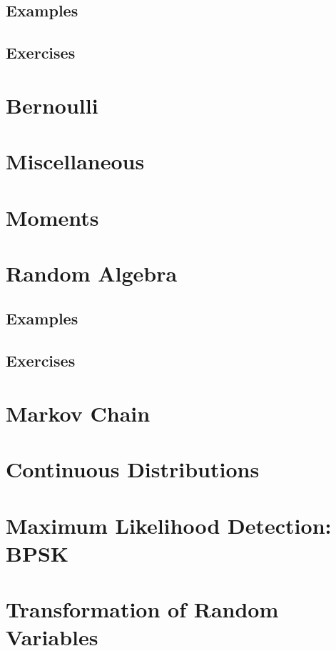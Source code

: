 \documentclass[journal]{IEEEtran}
\begin{document}
\subsection{Examples}

\subsection{Exercises}

\section{Bernoulli}


    \section{Miscellaneous}

\iffalse
\section{Moments}

\section{Random Algebra}
\subsection{Examples}

\subsection{Exercises}

\section{Markov Chain}

\section{Continuous Distributions}

\section{Maximum Likelihood Detection: BPSK}

\section{Transformation of Random Variables}

\end{document}
